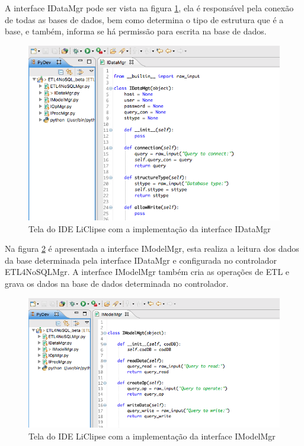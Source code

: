 A interface IDataMgr pode ser vista na figura \ref{idatamgr}, ela é responsável pela conexão de todas as bases de dados, bem como determina o tipo de estrutura que é a base, e também, informa se há permissão para escrita na base de dados.

\begin{figure}[h!]
	\centering
	\includegraphics[scale=0.7]{fig/idatamgr.png}
	\caption{Tela do IDE LiClipse com a implementação da interface IDataMgr}
	\label{idatamgr}
\end{figure}

Na figura \ref{imodelmgr} é apresentada a interface IModelMgr, esta realiza a leitura dos dados da base determinada pela interface IDataMgr e configurada no controlador ETL4NoSQLMgr. A interface IModelMgr também cria as operações de ETL e grava os dados na base de dados determinada no controlador.

\begin{figure}[h!]
	\centering
	\includegraphics[scale=0.6]{fig/imodelmgr.png}
	\caption{Tela do IDE LiClipse com a implementação da interface IModelMgr}
	\label{imodelmgr}
\end{figure}


